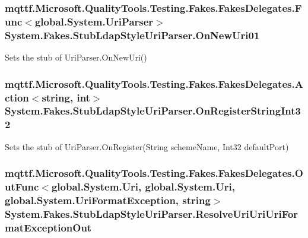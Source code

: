 \hypertarget{class_system_1_1_fakes_1_1_stub_ldap_style_uri_parser_a7231d16b9aa1974ed1cd998c9dcfbd30}{
\subsubsection[{On\-New\-Uri01}]{\setlength{\rightskip}{0pt plus 5cm}mqttf.\-Microsoft.\-Quality\-Tools.\-Testing.\-Fakes.\-Fakes\-Delegates.\-Func$<$global.\-System.\-Uri\-Parser$>$ System.\-Fakes.\-Stub\-Ldap\-Style\-Uri\-Parser.\-On\-New\-Uri01}}\label{class_system_1_1_fakes_1_1_stub_ldap_style_uri_parser_a7231d16b9aa1974ed1cd998c9dcfbd30}


Sets the stub of Uri\-Parser.\-On\-New\-Uri()

\hypertarget{class_system_1_1_fakes_1_1_stub_ldap_style_uri_parser_a21593df30382f54e0af1d6aa65384054}{
\subsubsection[{On\-Register\-String\-Int32}]{\setlength{\rightskip}{0pt plus 5cm}mqttf.\-Microsoft.\-Quality\-Tools.\-Testing.\-Fakes.\-Fakes\-Delegates.\-Action$<$string, int$>$ System.\-Fakes.\-Stub\-Ldap\-Style\-Uri\-Parser.\-On\-Register\-String\-Int32}}\label{class_system_1_1_fakes_1_1_stub_ldap_style_uri_parser_a21593df30382f54e0af1d6aa65384054}


Sets the stub of Uri\-Parser.\-On\-Register(\-String scheme\-Name, Int32 default\-Port)

\hypertarget{class_system_1_1_fakes_1_1_stub_ldap_style_uri_parser_ae567adb10eb3929eab1257e2cb6733a5}{
\subsubsection[{Resolve\-Uri\-Uri\-Uri\-Format\-Exception\-Out}]{\setlength{\rightskip}{0pt plus 5cm}mqttf.\-Microsoft.\-Quality\-Tools.\-Testing.\-Fakes.\-Fakes\-Delegates.\-Out\-Func$<$global.\-System.\-Uri, global.\-System.\-Uri, global.\-System.\-Uri\-Format\-Exception, string$>$ System.\-Fakes.\-Stub\-Ldap\-Style\-Uri\-Parser.\-Resolve\-Uri\-Uri\-Uri\-Format\-Exception\-Out}}\label{class_system_1_1_fakes_1_1_stub_ldap_style_uri_parser_ae567adb10eb3929eab1257e2cb6733a5}


